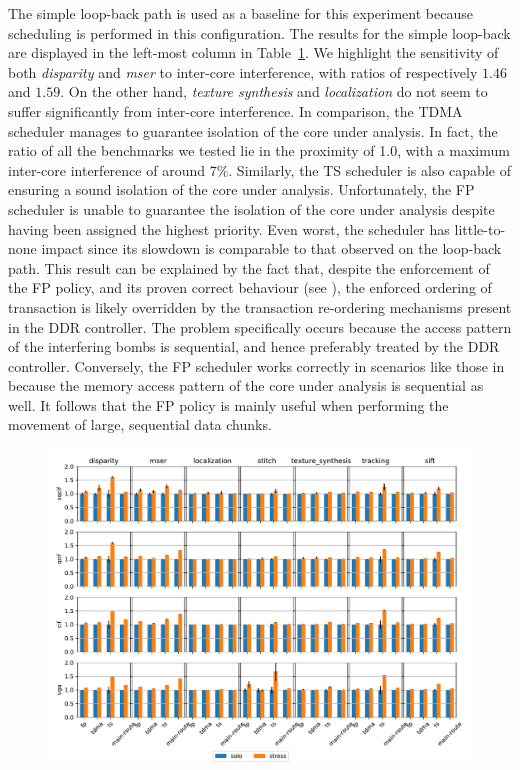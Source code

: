 The simple loop-back path is used as a baseline for this experiment
because scheduling is performed in this configuration. The results for
the simple loop-back are displayed in the left-most column in
Table~\ref{fig:isolation_ratio}. We highlight the sensitivity of both
\emph{disparity} and \emph{mser} to inter-core interference, with
ratios of respectively $1.46$ and $1.59$. On the other hand,
\emph{texture synthesis} and \emph{localization} do not seem to suffer
significantly from inter-core interference. In comparison, the TDMA
scheduler manages to guarantee isolation of the core under
analysis. In fact, the ratio of all the benchmarks we tested lie in
the proximity of 1.0, with a maximum inter-core interference of around
7\%. Similarly, the TS scheduler is also capable of ensuring a sound
isolation of the core under analysis. Unfortunately, the FP scheduler
is unable to guarantee the isolation of the core under analysis
despite having been assigned the highest priority. Even worst, the
scheduler has little-to-none impact since its slowdown is comparable
to that observed on the loop-back path.  This result can be explained
by the fact that, despite the enforcement of the FP policy, and its
proven correct behaviour (see ), the
enforced ordering of transaction is likely overridden by the
transaction re-ordering mechanisms present in the DDR controller. The
problem specifically occurs because the access pattern of the
interfering bombs is sequential, and hence preferably treated by the
DDR controller. Conversely, the FP scheduler works correctly in
scenarios like those in  because the
memory access pattern of the core under analysis is sequential as
well. It follows that the FP policy is mainly useful when performing
the movement of large, sequential data chunks.
\begin{figure}
    \centering
    \includegraphics[scale=0.53]{images/Execution_times.pdf}
    \caption{}
    \label{fig:isolation_ratio}
\end{figure}
